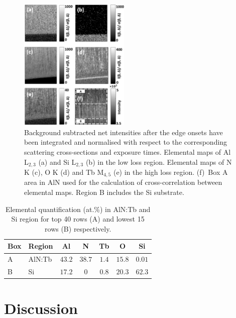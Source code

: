 \documentclass[%
aip,
rsi,%
 amsmath,amssymb,%
 reprint,%
]{revtex4-1}
\begin{document}
\begin{figure}%
    \includegraphics[width=0.47\textwidth]{combined_maps}
    \caption{Background subtracted net intensities after the edge onsets have been integrated and normalised with respect to the corresponding scattering cross-sections and exposure times. Elemental maps of Al L$_{2,3}$ (a) and Si L$_{2,3}$ (b) in the low loss region. Elemental maps of N K (c), O K (d) and Tb M$_{4,5}$ (e) in the high loss region. (f)~Box A area in AlN used for the calculation of cross-correlation between elemental maps. Region B includes the Si substrate.}
    \label{fig:combined_maps}
\end{figure}
\begin{table}%
	\caption{Elemental quantification (at.\%) in AlN:Tb and Si region for top 40 rows (A) and lowest 15 rows (B) respectively.}
    \label{tab:atper}
    \begin{ruledtabular}
    	\begin{tabular}{llccccc}
        	Box&Region&Al&N&Tb&O&Si		 	     			\\ \hline
            A&AlN:Tb&$43.2$&$38.7$&$1.4$&$15.8$&$0.01$   	\\
            B&Si &$17.2$&$0$&$0.8$&$20.3$&$62.3$
    	\end{tabular}
    \end{ruledtabular}
\end{table}

\section{Discussion} %
\label{sec:discussion}
\end{document}
